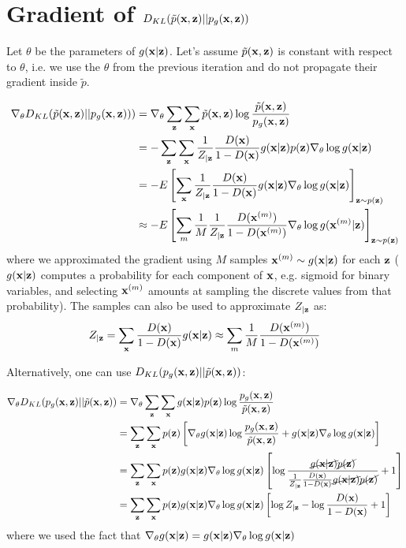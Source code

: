 \documentclass{article}
\begin{document}
   

\appendix

\section{Gradient of $D_{KL}(\tilde{p}(\x,\z) || p_g(\x,\z))$}
\label{app:dkl_gradient}

Let $\theta$ be the parameters of $g(\x|\z)$. Let's assume
$\tilde{p}(\x,\z)$ is constant with respect to $\theta$, i.e. we use
the $\theta$ from the previous iteration and do not propagate their gradient inside $\tilde{p}$.

\begin{align*}
\nabla_\theta D_{KL}( \tilde{p}(\x,\z) || p_g(\x,\z))) & =  \nabla_\theta \sum_\z \sum_\x \tilde{p}(\x,\z) \log{\frac{\tilde{p}(\x,\z)}{p_g(\x,\z)}} \\
& = - \sum_\z \sum_\x \frac{1}{Z_{|\z}}\frac{D(\x)}{1-D(\x)}g(\x|\z)p(\z) \nabla_\theta\log{g(\x|\z)} \\
& = - E\left[\sum_\x \frac{1}{Z_{|\z}}\frac{D(\x)}{1-D(\x)}g(\x|\z) \nabla_\theta\log{g(\x|\z)}\right]_{\z \sim p(\z)}\\
& \approx - E\left[\sum_m \frac{1}{M}\frac{1}{Z_{|\z}}\frac{D(\x^{(m)})}{1-D(\x^{(m)})}\nabla_\theta\log{g(\x^{(m)}|\z)}\right]_{\z \sim p(\z)}
\end{align*}
where we approximated the gradient using $M$ samples
$\x^{(m)} \sim g(\x|\z)$ for each $\z$ ($g(\x|\z)$ computes a
probability for each component of $\x$, e.g. sigmoid for binary
variables, and selecting $\x^{(m)}$ amounts at sampling the discrete
values from that probability). The samples can also be used to
approximate $Z_{|\z}$ as:
$$
Z_{|\z} = \sum_{\x} \frac{D(\x)}{1-D(\x)}g(\x|\z) \approx \sum_m  \frac{1}{M}\frac{D(\x^{(m)})}{1-D(\x^{(m)})}
$$

\noindent Alternatively, one can use $D_{KL}(p_g(\x,\z) || \tilde{p}(\x,\z))$:

\begin{align*}
\nabla_\theta D_{KL}( p_g(\x,\z) || \tilde{p}(\x,\z)) & =  \nabla_\theta \sum_\z \sum_\x g(\x|\z)p(\z) \log{\frac{p_g(\x,\z)}{\tilde{p}(\x,\z)}} \\
& =  \sum_\z \sum_\x p(\z) \left[ \nabla_\theta g(\x|\z)  \log{\frac{p_g(\x,\z)}{\tilde{p}(\x,\z)}} + g(\x|\z)  \nabla_\theta \log{g(\x|\z)} \right] \\
& = \sum_\z \sum_\x p(\z) g(\x|\z) \nabla_\theta \log{g(\x|\z)} \left[ \log{\frac{\cancel{g(\x|\z)}\cancel{p(\z)}}{\frac{1}{Z_{|\z}}\frac{D(\x)}{1-D(\x)}\cancel{g(\x|\z)}\cancel{p(\z)}}} + 1 \right] \\
& = \sum_\z \sum_\x p(\z) g(\x|\z) \nabla_\theta \log{g(\x|\z)} \left[\log{Z_{|\z}} - \log{\frac{D(\x)}{1-D(\x)}} + 1 \right]
\end{align*}
where we used the fact that $\nabla_\theta g(\x|\z) = g(\x|\z) \nabla_\theta  \log{g(\x|\z)}$
\end{document}
